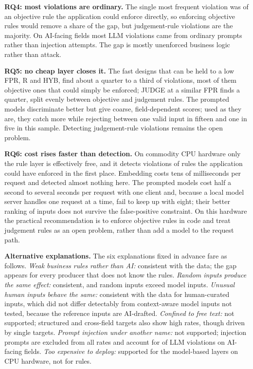 \documentclass[conference]{IEEEtran}
\begin{document}
\textbf{RQ4: most violations are ordinary.} The single most frequent violation was of an objective rule
the application could enforce directly, so enforcing objective rules would remove a share of the gap,
but judgement-rule violations are the majority. On AI-facing fields most LLM violations came from
ordinary prompts rather than injection attempts. The gap is mostly unenforced business logic rather
than attack.

\textbf{RQ5: no cheap layer closes it.} The fast designs that can be held to a low FPR, R and HYB, find
about a quarter to a third of violations, most of them objective ones that could simply be enforced;
JUDGE at a similar FPR finds a quarter, split evenly between objective and judgement rules. The prompted
models discriminate better but give coarse, field-dependent scores; used as they are, they catch more
while rejecting between one valid input in fifteen and one in five in this sample. Detecting
judgement-rule violations remains the open problem.

\textbf{RQ6: cost rises faster than detection.} On commodity CPU hardware only the rule layer is
effectively free, and it detects violations of rules the application could have enforced in the first
place. Embedding costs tens of milliseconds per request and detected almost nothing here. The prompted
models cost half a second to several seconds per request with one client and, because a local model server handles one request
at a time, fail to keep up with eight; their better ranking of inputs does not survive the
false-positive constraint. On this hardware the practical recommendation is to enforce objective rules
in code and treat judgement rules as an open problem, rather than add a model to the request path.

\textbf{Alternative explanations.} The six explanations fixed in advance fare as follows.
\emph{Weak business rules rather than AI:} consistent with the data; the gap appears for every
producer that does not know the rules. \emph{Random inputs produce the same effect:} consistent, and
random inputs exceed model inputs. \emph{Unusual human inputs behave the same:} \ifreviewed consistent with
the data for human-curated inputs, which did not differ detectably from context-aware model inputs\else
not tested, because the reference inputs are AI-drafted\fi. \emph{Confined to free text:} not supported; structured and
cross-field targets also show high rates, though driven by single targets. \emph{Prompt injection
under another name:} not supported; injection prompts are excluded from all rates and account for
 of  LLM violations on AI-facing fields. \emph{Too expensive to deploy:} supported for the model-based layers on CPU hardware, not for rules.
\end{document}
